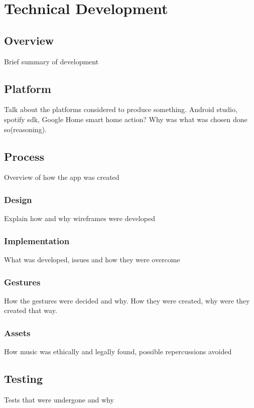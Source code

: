 \documentclass{l4proj}
\begin{document}

\chapter{Technical Development}

\section{Overview}
Brief summary of development

\section{Platform}
Talk about the platforms considered to produce something. Android studio, spotify sdk, Google Home smart home action? Why was what was chosen done so(reasoning).

\section{Process}
Overview of how the app was created

\subsection{Design}
Explain how and why wireframes were developed

\subsection{Implementation}
What was developed, issues and how they were overcome

\subsection{Gestures}
How the gestures were decided and why. How they were created, why were they created that way.

\subsection{Assets}
How music was ethically and legally found, possible repercussions avoided

\section{Testing}
Tests that were undergone and why
\end{document}
